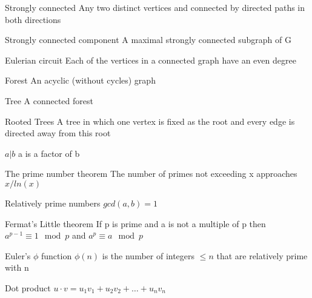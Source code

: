 \documentclass[grid,avery5371]{flashcards}
\begin{document}
\begin{flashcard}[]{Strongly connected}
	Any two distinct vertices and connected by directed paths in both directions
\end{flashcard}

\begin{flashcard}[]{Strongly connected component}
	A maximal strongly connected subgraph of G
\end{flashcard}

\begin{flashcard}[]{Eulerian circuit}
	Each of the vertices in a connected graph have an even degree
\end{flashcard}


\begin{flashcard}[]{Forest}
	An acyclic (without cycles) graph
\end{flashcard}

\begin{flashcard}[]{Tree}
	A connected forest
\end{flashcard}

\begin{flashcard}[]{Rooted Trees}
	A tree in which one vertex is fixed as the root and every edge is directed away from this root
\end{flashcard}


\begin{flashcard}[]{$a|b$}
	a is a factor of b
\end{flashcard}

\begin{flashcard}[]{The prime number theorem}
	The number of primes not exceeding x approaches $x/ln(x)$
\end{flashcard}

\begin{flashcard}[]{Relatively prime numbers}
	$gcd(a,b)=1$
\end{flashcard}

\begin{flashcard}[]{Fermat's Little theorem}
	If p is prime and a is not a multiple of p then $a^{p-1}\equiv 1\mod p$ and $a^p\equiv a\mod p$
\end{flashcard}

\begin{flashcard}[]{Euler's $\phi$ function}
	$\phi(n)$ is the number of integers $\leqslant n$ that are relatively prime with n
\end{flashcard}

\begin{flashcard}[]{Dot product}
	$u\cdot v=u_1v_1+u_2v_2+\ldots+u_nv_n$
\end{flashcard}
\end{document}
